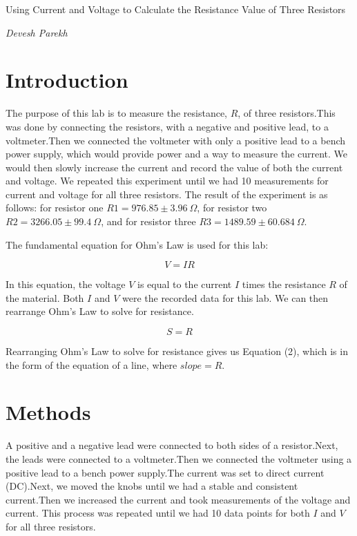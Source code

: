 \documentclass[onecolumn]{article}
\begin{document}
\begin{center}

{\Huge Using Current and Voltage to Calculate the Resistance Value of Three Resistors}\vskip 20pt

{\huge \em Devesh Parekh}

\end{center}

\section*{Introduction}

The purpose of this lab is to measure the resistance, $R$, of three resistors.This was done by connecting the resistors, with a negative and positive lead, to a voltmeter.Then we connected the voltmeter with only a positive lead to a bench power supply, which would provide power and a way to measure the current. We would then slowly increase the current and record the value of both the current and voltage. We repeated this experiment until we had 10 measurements for current and voltage for all three resistors. The result of the experiment is as follows: for resistor one $R1=976.85 \pm 3.96~\Omega$, for resistor two $R2=3266.05 \pm 99.4~\Omega$, and for resistor three $R3=1489.59 \pm 60.684~\Omega$.

The fundamental equation for Ohm's Law is used for this lab:

\begin{equation}
V=IR
\end{equation}

In this equation, the voltage $V$ is equal to the current $I$ times the resistance $R$ of the material. Both $I$ and $V$ were the recorded data for this lab. We can then rearrange Ohm's Law to solve for resistance.

\begin{equation}
S=R
\end{equation}

Rearranging Ohm's Law to solve for resistance gives us Equation (2), which is in the form of the equation of a line, where $slope=R$.

\section*{Methods}

A positive and a negative lead were connected to both sides of a resistor.Next, the leads were connected to a voltmeter.Then we connected the voltmeter using a positive lead to a bench power supply.The current was set to direct current (DC).Next, we moved the knobs until we had a stable and consistent current.Then we increased the current and took measurements of the voltage and current. This process was repeated until we had 10 data points for both $I$ and $V$ for all three resistors.
\end{document}
